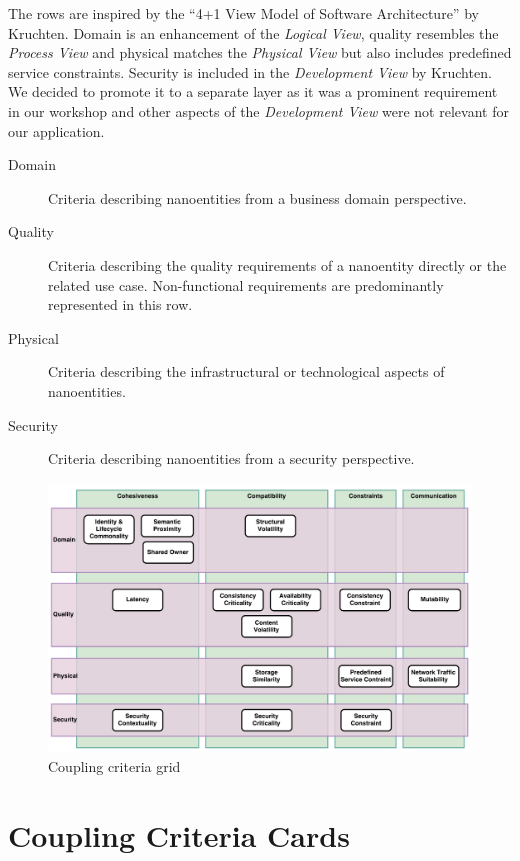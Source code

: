 \clearpage
The rows are inspired by the \enquote{4+1 View Model of Software Architecture} by Kruchten\cite{fourPlusOne}. Domain is an enhancement of the \textit{Logical View}, quality resembles the \textit{Process View} and physical matches the \textit{Physical View} but also includes predefined service constraints. Security is included in the \textit{Development View} by Kruchten. We decided to promote it to a separate layer as it was a prominent requirement in our workshop and other aspects of the \textit{Development View} were not relevant for our application.

\begin{description}
	\item[Domain] Criteria describing nanoentities from a business domain perspective.
	\item[Quality] Criteria describing the quality requirements of a nanoentity directly or the related use case. Non-functional requirements are predominantly represented in this row.
	\item[Physical] Criteria describing the infrastructural or technological aspects of nanoentities.
	\item[Security] Criteria describing nanoentities from a security perspective.
\end{description}

\begin{figure}[H]
	\includegraphics[scale=0.5]{diagrams/CouplingCatalog.pdf}
	\caption{Coupling criteria grid}
	\label{fig:cc_grid}
\end{figure}

\clearpage
\section{Coupling Criteria Cards}
\label{sec:couplingCriteriaCards}

